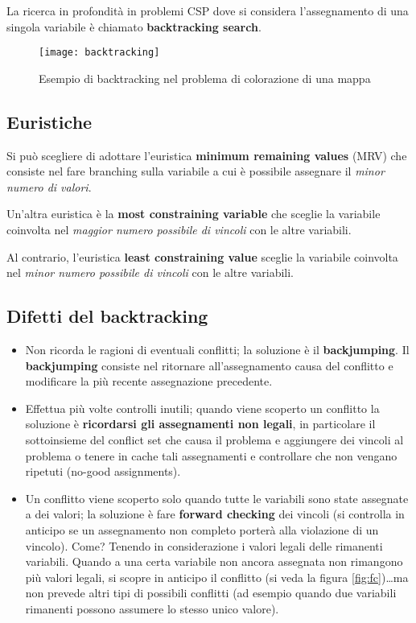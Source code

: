 La ricerca in profondità in problemi CSP dove si considera l'assegnamento
di una singola variabile è chiamato \textbf{backtracking search}.

\begin{figure}[H]
\caption{Esempio di backtracking nel problema di colorazione di una mappa}
\centering
\texttt{[image: backtracking]}
\end{figure}

\subsection{Euristiche}

Si può scegliere di adottare l'euristica \textbf{minimum remaining values}
(MRV) che consiste nel fare branching sulla variabile a cui è possibile
assegnare il \textit{minor numero di valori}.

Un'altra euristica è la \textbf{most constraining variable} che sceglie la
variabile coinvolta nel \textit{maggior numero possibile di vincoli} con le
altre variabili.

Al contrario, l'euristica \textbf{least constraining value} sceglie la
variabile coinvolta nel \textit{minor numero possibile di vincoli} con le
altre variabili.\\

\subsection{Difetti del backtracking}

\begin{itemize}
 \item Non ricorda le ragioni di eventuali conflitti; la soluzione è il
\textbf{backjumping}.
Il \textbf{backjumping} consiste nel ritornare all'assegnamento causa del
conflitto e modificare la più recente assegnazione precedente.

 \item Effettua più volte controlli inutili; quando viene scoperto un
conflitto la soluzione è \textbf{ricordarsi gli assegnamenti non legali}, in
particolare il sottoinsieme del conflict set che causa il problema e
aggiungere dei vincoli al problema o tenere in cache tali assegnamenti e
controllare che non vengano ripetuti (no-good assignments).

 \item Un conflitto viene scoperto solo quando tutte le variabili sono state assegnate a
dei valori; la soluzione è fare \textbf{forward checking} dei vincoli (si controlla
in anticipo se un assegnamento non completo porterà alla violazione di un vincolo).
Come? Tenendo in considerazione i valori legali delle rimanenti variabili. Quando a
una certa variabile non ancora assegnata non rimangono più valori legali, si scopre
in anticipo il conflitto (si veda la figura \ref{fig:fc})\dots ma non prevede
altri tipi di possibili conflitti (ad esempio quando due variabili rimanenti possono
assumere lo stesso unico valore).
\end{itemize}

